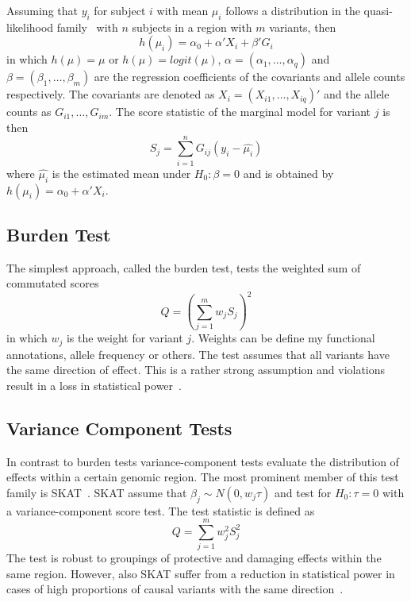 Assuming that $y_i$ for subject $i$ with mean $\mu_i$ follows a distribution in the quasi-likelihood family~\cite{Lee2014} with $n$ subjects in a region with $m$ variants, then
\begin{equation}
  h(\mu_i) = \alpha_0 + \alpha'X_i +\beta'G_i
\end{equation}
in which $h(\mu) = \mu$ or $h(\mu) = logit(\mu)$, $\alpha = (\alpha_1, \ldots, \alpha_q)$ and $\beta = (\beta_1, \ldots, \beta_m)$ are the regression coefficients of the covariants and allele counts respectively.
The covariants are denoted as $X_i = (X_{i1}, \ldots, X_{iq})'$ and the allele counts as $G_{i1}, \ldots, G_{im}$.
The score statistic of the marginal model for variant $j$ is then
\begin{equation}
  S_j = \sum^n_{i=1} G_{ij}(y_i-\hat{\mu_i})
\end{equation}
where $\hat{\mu_i}$ is the estimated mean under $H_0: \beta = 0 $ and is obtained by $h(\mu_i) = \alpha_0 + \alpha'X_i$.

\subsection{Burden Test}
\label{sub:burden_test}
The simplest approach, called the burden test, tests the weighted sum of commutated scores
\begin{equation}\label{eq:burden}
  Q = {(\sum^{m}_{j=1} w_{j} S_{j})}^2
\end{equation}
in which $w_j$ is the weight for variant $j$.
Weights can be define my functional annotations, allele frequency or others.
The test assumes that all variants  have the same direction of effect.
This is a rather strong assumption and violations result in a loss in statistical power~\cite{Derkach2013a}.

\subsection{Variance Component Tests}
\label{sub:variance_component_tests}
In contrast to burden tests variance-component tests evaluate the distribution of effects within a certain genomic region.
The most prominent member of this test family is SKAT~\cite{Wu2011}.
SKAT assume that $\beta_j\sim N(0,w_j\tau)$ and test for $H_0: \tau = 0$ with a variance-component score test.
The test statistic is defined as
\begin{equation}\label{eq:skat}
  Q = \sum^{m}_{j=1} w_{j}^2 S_{j}^2
\end{equation}
The test is robust to groupings of protective and damaging effects within the same region.
However, also SKAT suffer from a reduction in statistical power in cases of high proportions of causal variants with the same direction~\cite{Derkach2013a}.

